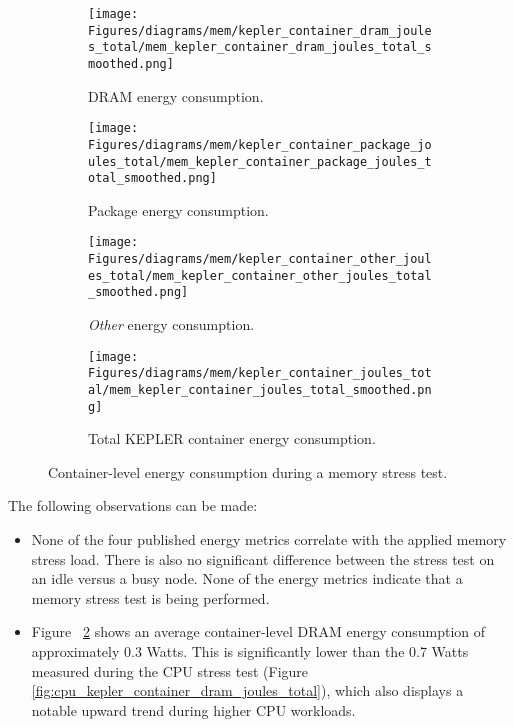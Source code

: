 \begin{figure}[H]
    \centering
    \begin{subfigure}{0.49\textwidth}
        \texttt{[image: Figures/diagrams/mem/kepler\_container\_dram\_joules\_total/mem\_kepler\_container\_dram\_joules\_total\_smoothed.png]}
        \caption{DRAM energy consumption.}
        \label{fig:mem_kepler_container_dram_joules_total}
    \end{subfigure}
    \begin{subfigure}{0.49\textwidth}
        \texttt{[image: Figures/diagrams/mem/kepler\_container\_package\_joules\_total/mem\_kepler\_container\_package\_joules\_total\_smoothed.png]}
        \caption{Package energy consumption.}
        \label{fig:mem_kepler_container_package_joules_total}
    \end{subfigure}
    \begin{subfigure}{0.49\textwidth}
        \texttt{[image: Figures/diagrams/mem/kepler\_container\_other\_joules\_total/mem\_kepler\_container\_other\_joules\_total\_smoothed.png]}
        \caption{\textit{Other} energy consumption.}
        \label{fig:mem_kepler_container_other_joules_total}
    \end{subfigure}
    \begin{subfigure}{0.49\textwidth}
        \texttt{[image: Figures/diagrams/mem/kepler\_container\_joules\_total/mem\_kepler\_container\_joules\_total\_smoothed.png]}
        \caption{Total KEPLER container energy consumption.}
        \label{fig:mem_kepler_container_joules_total}
    \end{subfigure}
    \caption{Container-level energy consumption during a memory stress test.}
\end{figure}

The following observations can be made:

\begin{itemize}
    \item None of the four published energy metrics correlate with the applied memory stress load. There is also no significant difference between the stress test on an idle versus a busy node. None of the energy metrics indicate that a memory stress test is being performed.
    \item Figure ~\ref{fig:mem_kepler_container_package_joules_total} shows an average container-level DRAM energy consumption of approximately 0.3 Watts. This is significantly lower than the 0.7 Watts measured during the CPU stress test (Figure \ref{fig:cpu_kepler_container_dram_joules_total}), which also displays a notable upward trend during higher CPU workloads.
\end{itemize}

